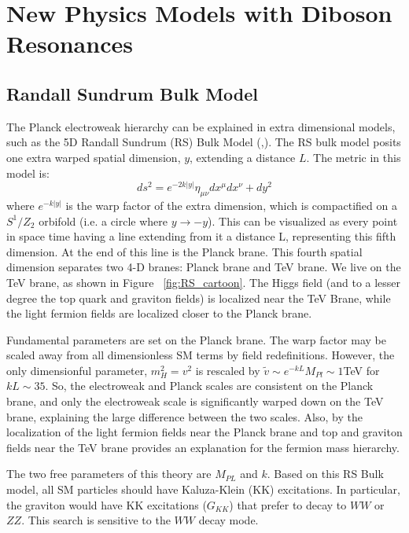 \chapter{New Physics Models with Diboson Resonances}
\label{BSM chapter}

\section{Randall Sundrum Bulk Model}
The  Planck electroweak hierarchy can be explained in extra dimensional models, such as the 5D Randall Sundrum (RS) Bulk Model (\cite{rs2},\cite{rs1}). The RS bulk model posits one extra warped spatial dimension, $y$, extending a distance $L$. The metric in this model is:
\begin{equation}
ds^{2}=e^{-2k|y|}\eta_{\mu\nu}dx^{\mu}dx^{\nu}+dy^{2} 
\end{equation}
where $e^{-k|y|}$ is the warp factor of the extra dimension, which is compactified on a $S^{1}/Z_{2}$ orbifold (i.e. a circle where $y \rightarrow -y$). This can be visualized as every point in space time having a line extending from it a distance L, representing this fifth dimension. At the end of this line is the Planck brane. This fourth spatial dimension separates two 4-D branes: Planck brane and TeV brane. We live on the TeV brane, as shown in Figure ~\ref{fig:RS_cartoon}. The Higgs field (and to a lesser degree the top quark and graviton fields) is localized near the TeV Brane, while the light fermion fields are localized closer to the Planck brane. 

Fundamental parameters are set on the Planck brane. The warp factor may be scaled away from all dimensionless SM terms by field redefinitions. However, the only dimensionful parameter, $m_{H}^{2}=v^{2}$ is rescaled by $\tilde{v}\sim e^{-kL}M_{Pl}\sim 1$TeV for $kL\sim 35$. So, the electroweak and Planck scales are consistent on the Planck brane, and only the electroweak scale is significantly warped down on the TeV brane, explaining the large difference between the two scales. Also, by the localization of the light fermion fields near the Planck brane and top and graviton fields near the TeV brane provides an explanation for the fermion mass hierarchy.

The two free parameters of this theory are $M_{PL}$ and $k$. Based on this RS Bulk model, all SM particles should have Kaluza-Klein (KK) excitations. In particular, the graviton would have KK excitations ($G_{KK}$) that prefer to decay to $WW$ or $ZZ$. This search is sensitive to the $WW$ decay mode.


